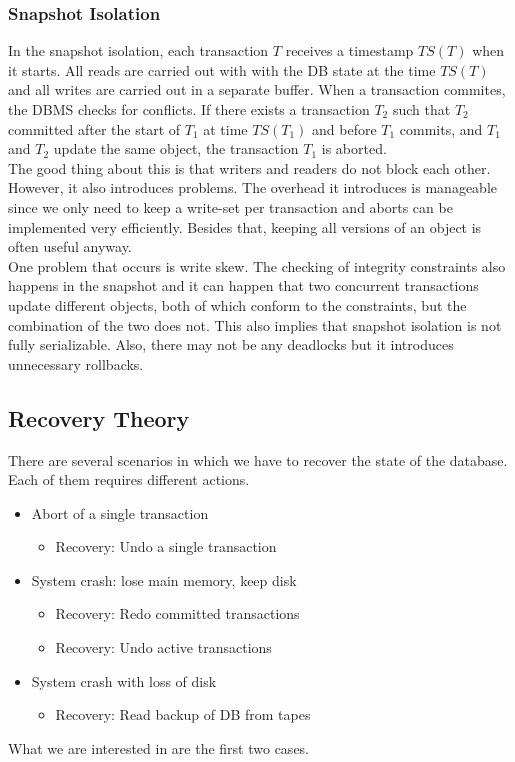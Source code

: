 \subsubsection{Snapshot Isolation}
In the snapshot isolation, each transaction $T$ receives a timestamp $TS(T)$ when it starts. All reads are carried out with with the DB state at the time $TS(T)$ and all writes are carried out in a separate buffer. When a transaction commites, the DBMS checks for conflicts. If there exists a transaction $T_2$ such that $T_2$ committed after the start of $T_1$ at time $TS(T_1)$ and before $T_1$ commits, and $T_1$ and $T_2$ update the same object, the transaction $T_1$ is aborted.\\
The good thing about this is that writers and readers do not block each other. However, it also introduces problems. The overhead it introduces is manageable since we only need to keep a write-set per transaction and aborts can be implemented very efficiently. Besides that, keeping all versions of an object is often useful anyway.\\
One problem that occurs is write skew. The checking of integrity constraints also happens in the snapshot and it can happen that two concurrent transactions update different objects, both of which conform to the constraints, but the combination of the two does not. This also implies that snapshot isolation is not fully serializable. Also, there may not be any deadlocks but it introduces unnecessary rollbacks.

\subsection{Recovery Theory}
There are several scenarios in which we have to recover the state of the database. Each of them requires different actions.
\begin{itemize}
\item Abort of a single transaction
\begin{itemize}
\item Recovery: Undo a single transaction
\end{itemize}
\item System crash: lose main memory, keep disk
\begin{itemize}
\item Recovery: Redo committed transactions
\item Recovery: Undo active transactions
\end{itemize}
\item System crash with loss of disk
\begin{itemize}
\item Recovery: Read backup of DB from tapes
\end{itemize}
\end{itemize}
What we are interested in are the first two cases. 

